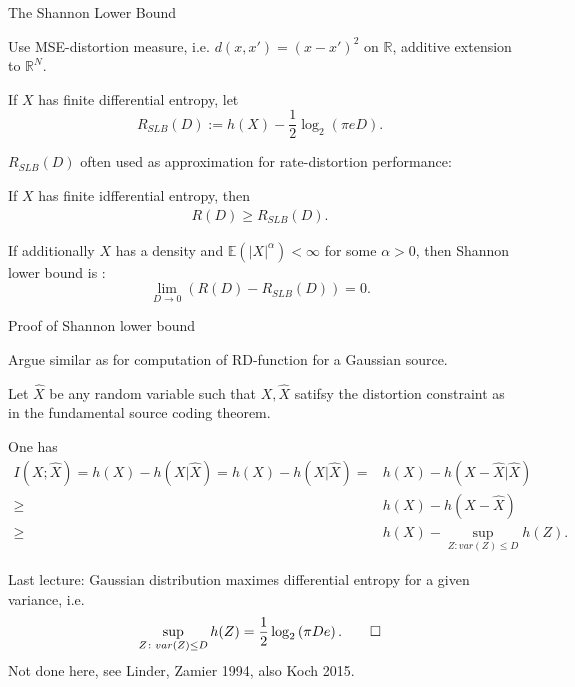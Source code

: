\begin{frame}{The Shannon Lower Bound}
\bit
\item Use MSE-distortion measure, i.e. $d(x,x')=(x-x')^2$ on $\mathbb{R}$, additive extension to $\mathbb{R}^N$.   
\item If $X$ has finite differential entropy, let
\[
R_{SLB}(D):=h(X)-\frac{1}{2}\log_2(\pi e D).
\]
\item $R_{SLB}(D)$ often used as approximation for rate-distortion performance: 
\eit
\begin{theorem}
\bit
\item If $X$ has finite idfferential entropy, then  
\begin{align*}
R(D)\geq R_{SLB}(D). 
\end{align*}
\item If additionally $X$ has a density and $\mathbb{E}(|X|^\alpha)<\infty$ for some $\alpha>0$, then Shannon lower bound is :
\[
\lim_{D\to 0}(R(D)-R_{SLB}(D))=0. 
\]
\eit
\end{theorem}

\end{frame}

\begin{frame}{Proof of Shannon lower bound}
\bit
\item Argue similar as for computation of RD-function for a Gaussian source. 
\item Let $\hat{X}$ be any random variable such that $X, \hat{X}$ satifsy the distortion constraint 
as in the fundamental source coding theorem.
\item One has 
\begin{align*}
I(X;\hat{X})=h(X)-h(X|\hat{X})
= h(X)-h(X|\hat{X})
= & h(X)-h(X-\hat{X}|\hat{X})\\
\geq & h(X)-h(X-\hat{X})\\
\geq & h(X)-\sup_{Z\colon var(Z)\leq D} h(Z). 
\end{align*}
\item Last lecture: Gaussian distribution maximes differential entropy for a given variance, i.e. 
\begin{align}
\sup_{Z\colon var(Z)\leq D} h(Z)= \frac{1}{2}\log_2\left(\pi D e\right). \qed
\end{align}
\eit
{} Not done here, see Linder, Zamier 1994, also Koch 2015.
\end{frame}


